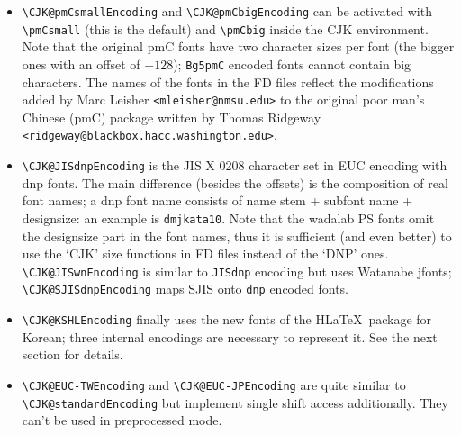 \documentclass[a4paper, 11pt, draft]{article}
\begin{document}
\begin{itemize}
  \texttt{hbf2gf} to transform bitmap fonts in HBF format to PK fonts as used by
  \texttt{CJK.sty}. Three commands (\verb+\CJKCJKchar+, \verb+\CJKhangulchar+, and \verb+\CJKlatinchar+)
  control the handling of intercharacter glue: \verb+\CJKCJKchar+ (the default)
  selects CJK style (using \verb+\CJKglue+), \verb+\CJKhangulchar+ selects hangul style
  (using \verb+\CJKtolerance+), and \verb+\CJKlatinchar+ selects none of them. This
  encoding does not work in preprocessed mode.
\item \verb+\CJK@pmCsmallEncoding+ and \verb+\CJK@pmCbigEncoding+ can be activated with
  \verb+\pmCsmall+ (this is the default) and \verb+\pmCbig+ inside the CJK environment.
  Note that the original \textsf{pmC} fonts have two character sizes per font (the
  bigger ones with an offset of $-128$); \texttt{Bg5pmC} encoded fonts cannot contain
  big characters. The names of the fonts in the FD files reflect the
  modifications added by Marc Leisher \verb+<mleisher@nmsu.edu>+ to the original
  poor man's Chinese (\textsf{pmC}) package written by Thomas Ridgeway
  \verb+<ridgeway@blackbox.hacc.washington.edu>+.
\item \verb+\CJK@JISdnpEncoding+ is the JIS X 0208 character set in EUC encoding with
  dnp fonts. The main difference (besides the offsets) is the composition of
  real font names; a dnp font name consists of name stem + subfont name +
  designsize: an example is \texttt{dmjkata10}. Note that the wadalab PS fonts omit
  the designsize part in the font names, thus it is sufficient (and even
  better) to use the `CJK' size functions in FD files instead of the `DNP'
  ones. \verb+\CJK@JISwnEncoding+ is similar to \texttt{JISdnp} encoding but uses Watanabe
  jfonts; \verb+\CJK@SJISdnpEncoding+ maps SJIS onto \texttt{dnp} encoded fonts.
\item \verb+\CJK@KSHLEncoding+ finally uses the new fonts of the H\LaTeX\ package for
  Korean; three internal encodings are necessary to represent it. See the
  next section for details.
\item \verb+\CJK@EUC-TWEncoding+ and \verb+\CJK@EUC-JPEncoding+ are quite similar to
  \verb+\CJK@standardEncoding+ but implement single shift access additionally. They
  can't be used in preprocessed mode.
\end{itemize}
\end{document}
